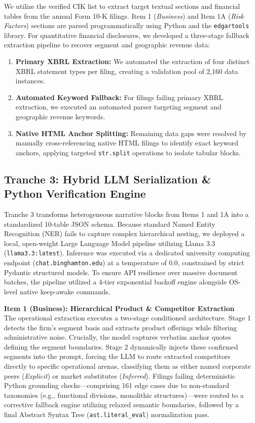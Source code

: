We utilize the verified CIK list to extract target textual sections and financial tables from the annual Form 10-K filings. Item 1 (\textit{Business}) and Item 1A (\textit{Risk Factors}) sections are parsed programmatically using Python and the \texttt{edgartools} library. For quantitative financial disclosures, we developed a three-stage fallback extraction pipeline to recover segment and geographic revenue data:
\begin{enumerate}
    \item \textbf{Primary XBRL Extraction:} We automated the extraction of four distinct XBRL statement types per filing, creating a validation pool of 2,160 data instances.
    \item \textbf{Automated Keyword Fallback:} For filings failing primary XBRL extraction, we executed an automated parser targeting segment and geographic revenue keywords.
    \item \textbf{Native HTML Anchor Splitting:} Remaining data gaps were resolved by manually cross-referencing native HTML filings to identify exact keyword anchors, applying targeted \texttt{str.split} operations to isolate tabular blocks.
\end{enumerate}

\subsection{Tranche 3: Hybrid LLM Serialization \& Python Verification Engine}
Tranche 3 transforms heterogeneous narrative blocks from Items 1 and 1A into a standardized 10-table JSON schema. Because standard Named Entity Recognition (NER) fails to capture complex hierarchical nesting, we deployed a local, open-weight Large Language Model pipeline utilizing Llama 3.3 (\texttt{llama3.3:latest}). Inference was executed via a dedicated university computing endpoint (\texttt{chat.binghamton.edu}) at a temperature of 0.0, constrained by strict Pydantic structured models. To ensure API resilience over massive document batches, the pipeline utilized a 4-tier exponential backoff engine alongside OS-level native keep-awake commands.

\vspace{0.5em}
\noindent\textbf{Item 1 (Business): Hierarchical Product \& Competitor Extraction} \\
The operational extraction executes a two-stage conditioned architecture. Stage 1 detects the firm's segment basis and extracts product offerings while filtering administrative noise. Crucially, the model captures verbatim anchor quotes defining the segment boundaries. Stage 2 dynamically injects these confirmed segments into the prompt, forcing the LLM to route extracted competitors directly to specific operational arenas, classifying them as either named corporate peers (\textit{Explicit}) or market substitutes (\textit{Inferred}). Filings failing deterministic Python grounding checks—comprising 161 edge cases due to non-standard taxonomies (e.g., functional divisions, monolithic structures)—were routed to a corrective fallback engine utilizing relaxed semantic boundaries, followed by a final Abstract Syntax Tree (\texttt{ast.literal\_eval}) normalization pass.

